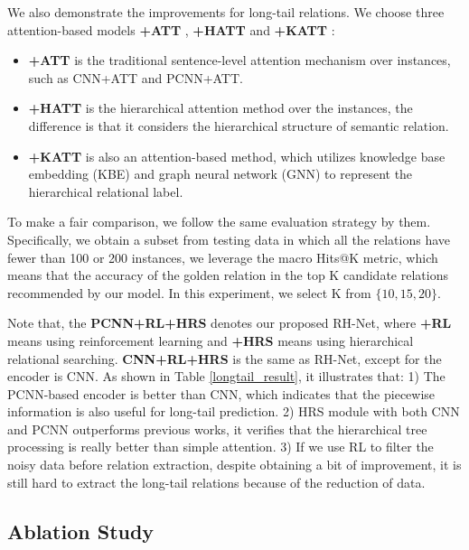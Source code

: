 \documentclass{article}
\begin{document}
We also demonstrate the improvements for long-tail relations. We choose three attention-based models \textbf{+ATT} \cite{Lin2016Neural}, \textbf{+HATT} \cite{han2018hierarchical} and \textbf{+KATT} \cite{zhang2019long-tail}:
\begin{itemize}
    \item \textbf{+ATT} is the traditional sentence-level attention mechanism over instances, such as CNN+ATT and PCNN+ATT\cite{Lin2016Neural}.
    
    \item \textbf{+HATT}  is the hierarchical attention method over the instances, the difference is that it considers the hierarchical structure of semantic relation.
    
    \item \textbf{+KATT} is also an attention-based method, which utilizes knowledge base embedding (KBE) and graph neural network (GNN) to represent the hierarchical relational label.
    
\end{itemize}
To make a fair comparison, we follow the same evaluation strategy by them. Specifically, we obtain a subset from testing data in which all the relations have fewer than 100 or 200 instances, we leverage the macro Hits@K metric, which means that the accuracy of the golden relation in the top K candidate relations recommended by our model. In this experiment, we select K from $\{10,15,20\}$. 

Note that, the \textbf{PCNN+RL+HRS} denotes our proposed RH-Net, where \textbf{+RL} means using reinforcement learning and \textbf{+HRS} means using hierarchical relational searching. \textbf{CNN+RL+HRS} is the same as RH-Net, except for the encoder is CNN. As shown in Table \ref{longtail_result}, it illustrates that: 1) The PCNN-based encoder is better than CNN, which indicates that the piecewise information is also useful for long-tail prediction. 2) HRS module with both CNN and PCNN outperforms previous works, it verifies that the hierarchical tree processing is really better than simple attention. 3) If we use RL to filter the noisy data before relation extraction, despite obtaining a bit of improvement, it is still hard to extract the long-tail relations because of the reduction of data. 


\subsection{Ablation Study}
\end{document}
